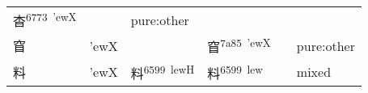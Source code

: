 \documentclass[14pt,a4paper]{scrartcl}
\begin{document}
\begin{longtable}[c]{@{}llllll@{}}
\begin{minipage}[t]{0.14\columnwidth}
杳\textsuperscript{6773~'ewX}
\strut\end{minipage} &
\begin{minipage}[t]{0.14\columnwidth}\raggedright\strut
\strut\end{minipage} &
\begin{minipage}[t]{0.14\columnwidth}\raggedright\strut
pure:other
\strut\end{minipage}\tabularnewline
\begin{minipage}[t]{0.14\columnwidth}\raggedright\strut
窅
\strut\end{minipage} &
\begin{minipage}[t]{0.14\columnwidth}\raggedright\strut
'ewX
\strut\end{minipage} &
\begin{minipage}[t]{0.14\columnwidth}\raggedright\strut
\strut\end{minipage} &
\begin{minipage}[t]{0.14\columnwidth}\raggedright\strut
窅\textsuperscript{7a85~'ewX}
\strut\end{minipage} &
\begin{minipage}[t]{0.14\columnwidth}\raggedright\strut
\strut\end{minipage} &
\begin{minipage}[t]{0.14\columnwidth}\raggedright\strut
pure:other
\strut\end{minipage}\tabularnewline
\begin{minipage}[t]{0.14\columnwidth}\raggedright\strut
料
\strut\end{minipage} &
\begin{minipage}[t]{0.14\columnwidth}\raggedright\strut
'ewX
\strut\end{minipage} &
\begin{minipage}[t]{0.14\columnwidth}\raggedright\strut
料\textsuperscript{6599~lewH}
\strut\end{minipage} &
\begin{minipage}[t]{0.14\columnwidth}\raggedright\strut
料\textsuperscript{6599~lew}
\strut\end{minipage} &
\begin{minipage}[t]{0.14\columnwidth}\raggedright\strut
\strut\end{minipage} &
\begin{minipage}[t]{0.14\columnwidth}\raggedright\strut
mixed
\strut\end{minipage}\tabularnewline
\bottomrule
\end{longtable}
\end{document}
